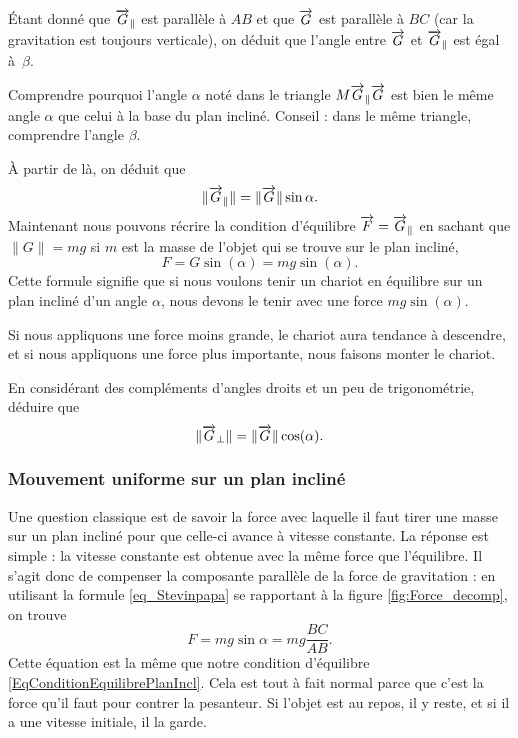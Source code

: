 Étant donné que $\overrightarrow{G}_{\parallel}$ est parallèle à $AB$ et que $\overrightarrow{G}$ est parallèle à $BC$ (car la gravitation est toujours verticale), on déduit que l'angle entre $\overrightarrow{G}$ et $\overrightarrow{G}_{\parallel}$ est égal à~$\beta$.

\begin{exercice}
Comprendre pourquoi l'angle $\alpha$ noté dans le triangle $M\overrightarrow{G}_{\parallel}\overrightarrow{G}$ est bien le même angle $\alpha$ que celui à la base du plan incliné. Conseil : dans le même triangle, comprendre l'angle $\beta$.
\end{exercice}

À partir de là, on déduit que 
\begin{equation}				\label{eq_Stevinpapa}
	\| \overrightarrow{G}_{\parallel} \|=\| \overrightarrow{G} \|\sin\alpha.
\end{equation}
Maintenant nous pouvons récrire la condition d'équilibre $\overrightarrow{F}=\overrightarrow{G}_{\parallel}$ en sachant que $\| G \|=mg$ si $m$ est la masse de l'objet qui se trouve sur le plan incliné,
\begin{equation}			\label{EqConditionEquilibrePlanIncl}
	F=G\sin(\alpha)=mg\sin(\alpha).
\end{equation}
Cette formule signifie que si nous voulons tenir un chariot en équilibre sur un plan incliné d'un angle $\alpha$, nous devons le tenir avec une force $mg\sin(\alpha)$.

Si nous appliquons une force moins grande, le chariot aura tendance à descendre, et si nous appliquons une force plus importante, nous faisons monter le chariot.

\begin{exercice}
En considérant des compléments d'angles droits et un peu de trigonométrie, déduire que
\[ 
	\| \overrightarrow{G}_{\perp} \|=\| \overrightarrow{G} \|\cos(\alpha).
\]
\end{exercice}


\subsubsection{Mouvement uniforme sur un plan incliné}
\label{sss_inclineF}

Une question classique est de savoir la force avec laquelle il faut tirer une masse sur un plan incliné pour que celle-ci avance à vitesse constante. La réponse est simple : la vitesse constante est obtenue avec la même force que l'équilibre. Il s'agit donc de compenser la composante parallèle de la force de gravitation : en utilisant la formule \eqref{eq_Stevinpapa} se rapportant à la figure \ref{fig:Force_decomp}, on trouve
\begin{equation} \label{eq_expunF}
	F=mg\sin\alpha=mg\frac{ BC }{ AB }.
\end{equation}
Cette équation est la même que notre condition d'équilibre \eqref{EqConditionEquilibrePlanIncl}. Cela est tout à fait normal parce que c'est la force qu'il faut pour contrer la pesanteur. Si l'objet est au repos, il y reste, et si il a une vitesse initiale, il la garde.


